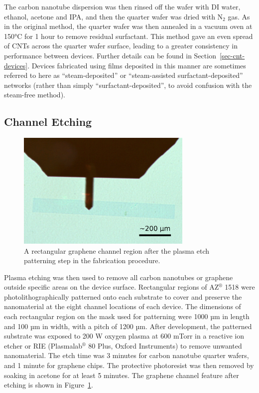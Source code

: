 \documentclass[
  a4paper,
]{scrbook}
\begin{document}
The carbon nanotube dispersion was then rinsed off the wafer with DI
water, ethanol, acetone and IPA, and then the quarter wafer was dried
with N\(_2\) gas. As in the original method, the quarter wafer was then
annealed in a vacuum oven at 150°C for 1 hour to remove residual
surfactant. This method gave an even spread of CNTs across the quarter
wafer surface, leading to a greater consistency in performance between
devices. Further details can be found in Section~\ref{sec-cnt-devices}.
Devices fabricated using films deposited in this manner are sometimes
referred to here as ``steam-deposited'' or ``steam-assisted
surfactant-deposited'' networks (rather than simply
``surfactant-deposited'', to avoid confusion with the steam-free
method).

\hypertarget{channel-etching}{%
\subsection{Channel Etching}\label{channel-etching}}

\begin{figure}

{\centering \includegraphics[width=0.75\textwidth,height=\textheight]{figures/ch4/modified_channel-area.png}

}

\caption{\label{fig-microscope-graphene-channel}A rectangular graphene
channel region after the plasma etch patterning step in the fabrication
procedure.}

\end{figure}

Plasma etching was then used to remove all carbon nanotubes or graphene
outside specific areas on the device surface. Rectangular regions of
AZ\(^\circledR\) 1518 were photolithographically patterned onto each
substrate to cover and preserve the nanomaterial at the eight channel
locations of each device. The dimensions of each rectangular region on
the mask used for patterning were 1000 µm in length and 100 µm in width,
with a pitch of 1200 µm. After development, the patterned substrate was
exposed to 200 W oxygen plasma at 600 mTorr in a reactive ion etcher or
RIE (Plasmalab\(^\circledR\) 80 Plus, Oxford Instruments) to remove
unwanted nanomaterial. The etch time was 3 minutes for carbon nanotube
quarter wafers, and 1 minute for graphene chips. The protective
photoresist was then removed by soaking in acetone for at least 5
minutes. The graphene channel feature after etching is shown in
Figure~\ref{fig-microscope-graphene-channel}.
\end{document}
